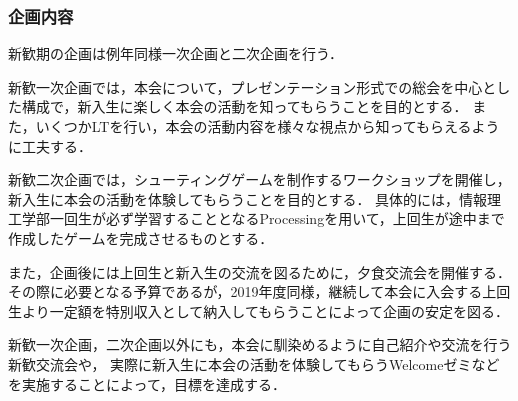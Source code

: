\subsubsection*{企画内容}
新歓期の企画は例年同様一次企画と二次企画を行う．

新歓一次企画では，本会について，プレゼンテーション形式での総会を中心とした構成で，新入生に楽しく本会の活動を知ってもらうことを目的とする．
また，いくつかLTを行い，本会の活動内容を様々な視点から知ってもらえるように工夫する．

新歓二次企画では，シューティングゲームを制作するワークショップを開催し，新入生に本会の活動を体験してもらうことを目的とする．
具体的には，情報理工学部一回生が必ず学習することとなるProcessingを用いて，上回生が途中まで作成したゲームを完成させるものとする．

また，企画後には上回生と新入生の交流を図るために，夕食交流会を開催する．
その際に必要となる予算であるが，2019年度同様，継続して本会に入会する上回生より一定額を特別収入として納入してもらうことによって企画の安定を図る．

新歓一次企画，二次企画以外にも，本会に馴染めるように自己紹介や交流を行う新歓交流会や，
実際に新入生に本会の活動を体験してもらうWelcomeゼミなどを実施することによって，目標を達成する．


